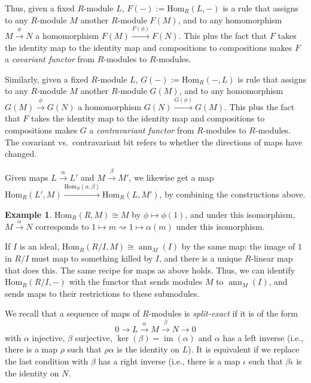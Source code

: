 \documentclass{amsart}[12pt]
\def\ann{\operatorname{ann}}
\def\image{\operatorname{im}}
\def\im{\image}
\def\ker{\operatorname{ker}}
\newcommand{\Hom}{\mathrm{Hom}}
\numberwithin{equation}{section}
\theoremstyle{plain} %
\theoremstyle{definition}
\newtheorem{ex}[equation]{Example}
\theoremstyle{remark}
\newcommand{\xra}[1]{\xrightarrow{#1}}
\begin{document}
Thus, given a fixed $R$-module $L$, $F(-):=\Hom_R(L,-)$ is a rule that assigns to any $R$-module $M$ another $R$-module $F(M)$, and to any homomorphism $M \xrightarrow{\phi} N$ a homomorphism $F(M) \xrightarrow{F(\phi)} F(N)$. This plus the fact that $F$ takes the identity map to the identity map and compositions to compositions makes $F$ a \emph{covariant functor} from $R$-modules to $R$-modules.

Similarly, given a fixed $R$-module $L$, $G(-):= \Hom_R(-,L)$ is rule that assigns to any $R$-module $M$ another $R$-module $G(M)$, and to any homomorphism $G(M) \xrightarrow{\phi} G(N)$ a homomorphism $G(N) \xrightarrow{G(\phi)} G(M)$. This plus the fact that $F$ takes the identity map to the identity map and compositions to compositions makes $G$ a \emph{contravariant functor} from $R$-modules to $R$-modules. The covariant vs.~contravariant bit refers to whether the directions of maps have changed.

Given maps $L \xrightarrow{\alpha} L'$ and $M \xrightarrow{\beta} M'$, we likewise get a map $\Hom_R(L',M) \xrightarrow{\Hom_R(\alpha,\beta)} \Hom_R(L,M')$, by combining the constructions above.

\begin{ex}
$\Hom_R(R,M)\cong M$ by $\phi\mapsto \phi(1)$, and under this isomorphism, $M \xrightarrow{\alpha} N$ corresponds to $1 \mapsto m \rightsquigarrow 1 \mapsto \alpha(m)$ under this isomorphism.

If $I$ is an ideal, $\Hom_R(R/I,M)\cong \ann_M(I)$ by the same map: the image of $1$ in $R/I$ must map to something killed by $I$, and there is a unique $R$-linear map that does this. The same recipe for maps as above holds. Thus, we can identify $\Hom_R(R/I,-)$ with the functor that sends modules $M$ to $\ann_M(I)$, and sends maps to their restrictions to these submodules.
\end{ex}

We recall that a sequence of maps of $R$-modules is \emph{split-exact} if it is of the form
\[ 0 \to L \xra{\alpha} M \xra{\beta} N \to 0\]
with $\alpha$ injective, $\beta$ surjective, $\ker(\beta)=\im(\alpha)$ and $\alpha$ has a left inverse (i.e., there is a map $\rho$ such that $\rho \alpha$ is the identity on $L$). It is equivalent if we replace the last condition with $\beta$ has a right inverse (i.e., there is a map $\iota$ such that $\beta \iota$ is the identity on $N$.
\end{document}
